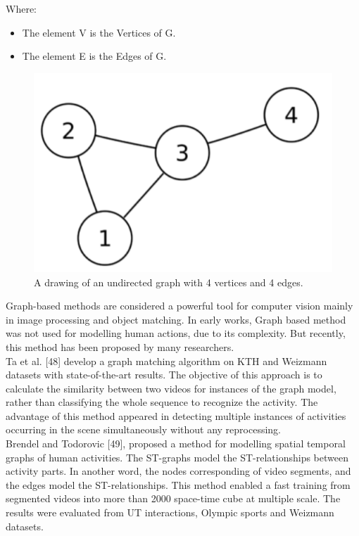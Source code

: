 Where:
\begin{itemize}
\item The element V is the Vertices of G.
\item The element E is the Edges of G.  
\end{itemize}

\begin{figure}[ht]
\centering
\includegraphics{Figures/grr}
\decoRule
\caption[A drawing of an undirected graph with 4 vertices and 4 edges.]{A drawing of an undirected graph with 4 vertices and 4 edges.}
\label{fig:la}
\end{figure}
Graph-based methods are considered a powerful tool for computer vision mainly in image processing and object matching. In early works, Graph based method was not used for modelling human actions, due to its complexity. But recently, this method has been proposed by many researchers. \\

Ta et al. [48] develop a graph matching algorithm on KTH and Weizmann datasets with state-of-the-art results. The objective of this approach is to calculate the similarity between two videos for instances of the graph model, rather than classifying the whole sequence to recognize the activity. The advantage of this method appeared in detecting multiple instances of activities occurring in the scene simultaneously without any reprocessing. \\

Brendel and Todorovic [49], proposed a method for modelling spatial temporal graphs of human activities. The ST-graphs model the ST-relationships between activity parts. In another word, the nodes corresponding of video segments, and the edges model the ST-relationships. This method enabled a fast training from segmented videos into more than 2000 space-time cube at multiple scale. The results were evaluated from UT interactions, Olympic sports and Weizmann datasets. \\

